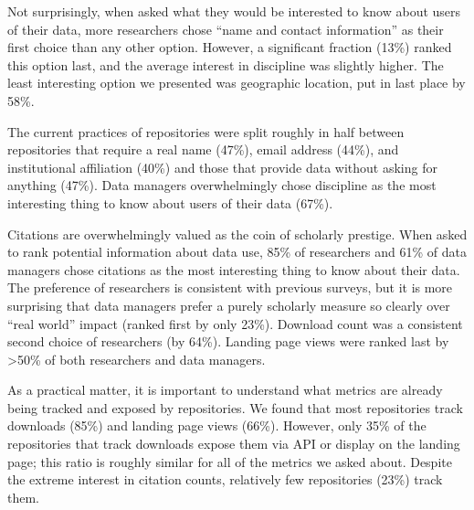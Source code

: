 \documentclass[english]{article}
\begin{document}
Not surprisingly, when asked what they would be interested to know about users of their data, more researchers chose ``name and contact information'' as their first choice than any other option.
However, a significant fraction (13\%) ranked this option last, and the average interest in discipline was slightly higher.
The least interesting option we presented was geographic location, put in last place by 58\%.

The current practices of repositories were split roughly in half between repositories that require a real name (47\%), email address (44\%), and institutional affiliation (40\%) and those that provide data without asking for anything (47\%).
Data managers overwhelmingly chose discipline as the most interesting thing to know about users of their data (67\%).


Citations are overwhelmingly valued as the coin of scholarly prestige. 
When asked to rank potential information about data use, 85\% of researchers and 61\% of data managers chose citations as the most interesting thing to know about their data. 
The preference of researchers is consistent with previous surveys\cite{@kratz_researcher_2015}, but it is more surprising that data managers prefer a purely scholarly measure so clearly over ``real world'' impact (ranked first by only 23\%). 
Download count was a consistent second choice of researchers (by 64\%). 
Landing page views were ranked last by >50\% of both researchers and data managers.

As a practical matter, it is important to understand what metrics are already being tracked and exposed by repositories. 
We found that most repositories track downloads (85\%) and landing page views (66\%). 
However, only 35\% of the repositories that track downloads expose them via API or display on the landing page; this ratio is roughly similar for all of the metrics we asked about. 
Despite the extreme interest in citation counts, relatively few repositories (23\%) track them. 

\end{document}
